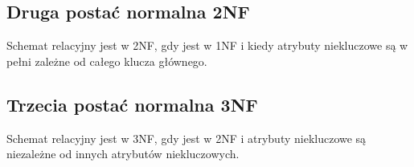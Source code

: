 \documentclass[12pt, a4paper]{article}
\begin{document}
\subsection*{Druga postać normalna 2NF}
Schemat relacyjny jest w 2NF, gdy jest w 1NF i kiedy atrybuty niekluczowe są
w pełni zależne od całego klucza głównego.
\subsection*{Trzecia postać normalna 3NF}
Schemat relacyjny jest w 3NF, gdy jest w 2NF i atrybuty niekluczowe są niezależne od innych
atrybutów niekluczowych.
\end{document}
